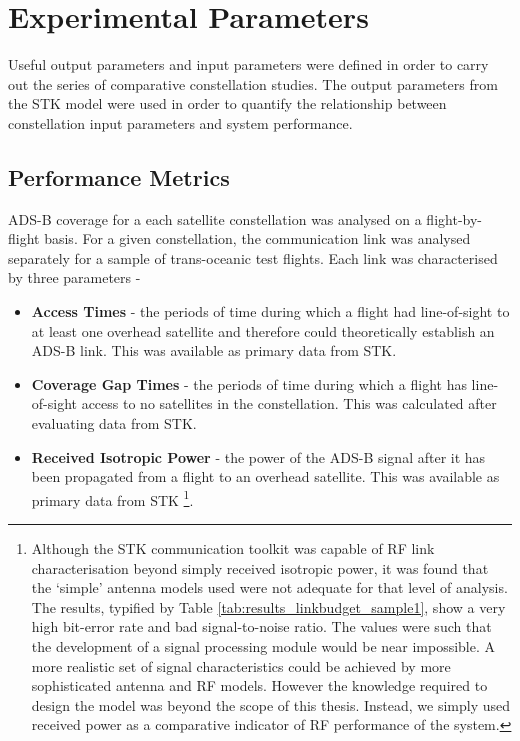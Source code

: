 \section{Experimental Parameters}
Useful output parameters and input parameters were defined in order to carry out the series of comparative constellation studies. The output parameters from the STK model were used in order to quantify the relationship between constellation input parameters and system performance.
\subsection{Performance Metrics}
\label{sec:perfMetrics}
ADS-B coverage for a each satellite constellation was analysed on a flight-by-flight basis. For a given constellation, the communication link was analysed separately for a sample of trans-oceanic test flights. Each link was characterised by three parameters -
\begin{itemize}
	\item \textbf{Access Times} - the periods of time during which a flight had line-of-sight to at least one overhead satellite and therefore could theoretically establish an ADS-B link. This was available as primary data from STK.
	\item \textbf{Coverage Gap Times} - the periods of time during which a flight has line-of-sight access to no satellites in the constellation. This was calculated after evaluating data from STK.
	\item \textbf{Received Isotropic Power} - the power of the ADS-B signal after it has been propagated from a flight to an overhead satellite. This was available as primary data from STK \footnote{Although the STK communication toolkit was capable of RF link characterisation beyond simply received isotropic power, it was found that the `simple' antenna models used were not adequate for that level of analysis. The results, typified by Table \ref{tab:results_linkbudget_sample1}, show a very high bit-error rate and bad signal-to-noise ratio. The values were such that the development of a signal processing module would be near impossible. A more realistic set of signal characteristics could be achieved by more sophisticated antenna and RF models. However the knowledge required to design the model was beyond the scope of this thesis. Instead, we simply used received power as a comparative indicator of RF performance of the system.}.
\end{itemize}

